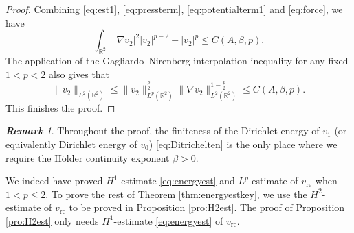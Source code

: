 \documentclass[12pt]{amsart}
\numberwithin{equation}{section}              %
\theoremstyle{remark}
\newtheorem{remark}{\bf Remark}[section]
\begin{document}
\begin{proof}
			Combining  \eqref{eq:est1}, \eqref{eq:pressterm}, \eqref{eq:potentialterm1} and \eqref{eq:force}, we have 
			\begin{equation*}
				\int_{\mathbb{R}^2} |\nabla v_2|^2 |v_2|^{p-2} +  |v_2|^{p} \leq C(A,\beta, p).
			\end{equation*}
			The application of  the Gagliardo–Nirenberg interpolation inequality  for any fixed $1<p<2$ also gives that
			\begin{equation*}
				\|v_2\|_{L^{2}(\mathbb{R}^2)} \leq 	\|v_2\|_{L^{p}(\mathbb{R}^2)}^{\frac{p}{2}} 	\|\nabla v_2\|_{L^{2}(\mathbb{R}^2)}^{1-\frac{p}{2}} \leq C(A,\beta, p).
			\end{equation*}					
			This finishes the proof.
		\end{proof}
		
		\begin{remark}
			Throughout the proof, the finiteness of the  Dirichlet energy  of $v_1$ (or equivalently Dirichlet energy  of $v_0$) \eqref{eq:Ditrichelten} is the only place where we require the H\"older continuity exponent $\beta>0$. 
		\end{remark} 
        We indeed have proved $H^1$-estimate \eqref{eq:energyest} and $L^p$-estimate of $v_{\textrm{re}}$ when $1<p\leq 2$. To prove the rest of 
Theorem \ref{thm:energyestkey}, we use the $H^2$-estimate of $v_{\text{re}}$ to be proved in Proposition \ref{pro:H2est}. The proof of 
Proposition \ref{pro:H2est} only needs $H^1$-estimate \eqref{eq:energyest}  of $v_{\textrm{re}}$.
\end{document}

